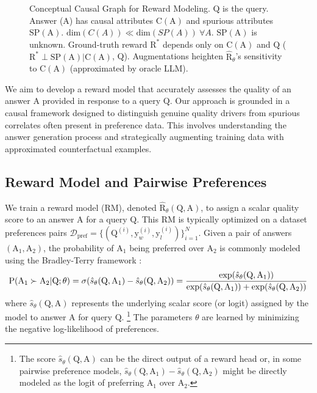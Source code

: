 \begin{figure}[!t]
\caption{Conceptual Causal Graph for Reward Modeling. $\mathrm{Q}$ is the query. Answer (A) has causal attributes $\mathrm{C}(\mathrm{A})$ and spurious attributes $\mathrm{SP}(\mathrm{A})$. $\text{dim}(C(A)) \ll \text{dim}(SP(A))\ \forall A$. $\mathrm{SP(A)}$ is unknown. Ground-truth reward $\mathrm{R}^*$ depends only on $\mathrm{C(A)}$ and $\mathrm{Q}$ ($\mathrm{R^*} \perp \mathrm{SP(A)} | \mathrm{C(A)}$, Q). Augmentations heighten $\hat{\mathrm{R}}_\theta$'s sensitivity to $\mathrm{C(A)}$ (approximated by oracle LLM).}
\label{fig:causal_graph}
\vspace{-0.15in}
\end{figure}


\vspace{-0.05in}
We aim to develop a reward model that accurately assesses the quality of an answer $\mathrm{A}$ provided in response to a query $\mathrm{Q}$. Our approach is grounded in a causal framework designed to distinguish genuine quality drivers from spurious correlates often present in preference data. This involves understanding the answer generation process and strategically augmenting training data with approximated counterfactual examples.

\vspace{-0.1in}
\subsection{Reward Model and Pairwise Preferences}
We train a reward model (RM), denoted $\hat{\mathrm{R}}_\theta(\mathrm{Q}, \mathrm{A})$, to assign a scalar quality score to an answer $\mathrm{A}$ for a query $\mathrm{Q}$. This RM is typically optimized on a dataset  preferences pairs $\mathcal{D}_{\mathrm{pref}} = \{(\mathrm{Q}^{(i)}, \mathrm{y}_w^{(i)}, \mathrm{y}_l^{(i)})\}_{i=1}^N$. Given a pair of answers $(\mathrm{A}_1, \mathrm{A}_2)$, the probability of $\mathrm{A}_1$ being preferred over $\mathrm{A}_2$ is commonly modeled using the Bradley-Terry framework \citep{bradley1952rank}:
\begin{equation}
\mathrm{P}(\mathrm{A}_1 \succ \mathrm{A}_2 | \mathrm{Q}; \theta) = \sigmoid(\hat{s}_\theta(\mathrm{Q}, \mathrm{A}_1) - \hat{s}_\theta(\mathrm{Q}, \mathrm{A}_2)) = \frac{\exp(\hat{s}_\theta(\mathrm{Q}, \mathrm{A}_1))}{\exp(\hat{s}_\theta(\mathrm{Q}, \mathrm{A}_1)) + \exp(\hat{s}_\theta(\mathrm{Q}, \mathrm{A}_2))}
\label{eq:bt_prob_roman}
\end{equation}
where $\hat{s}_\theta(\mathrm{Q}, \mathrm{A})$ represents the underlying scalar score (or logit) assigned by the model to answer $\mathrm{A}$ for query $\mathrm{Q}$. \footnote{The score $\hat{s}_\theta(\mathrm{Q}, \mathrm{A})$ can be the direct output of a reward head or, in some pairwise preference models, $\hat{s}_\theta(\mathrm{Q}, \mathrm{A}_1) - \hat{s}_\theta(\mathrm{Q}, \mathrm{A}_2)$ might be directly modeled as the logit of preferring $\mathrm{A}_1$ over $\mathrm{A}_2$.} The parameters $\theta$ are learned by minimizing the negative log-likelihood of  preferences.


